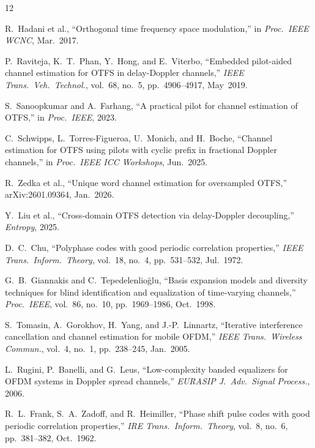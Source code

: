 \documentclass[11pt,a4paper,twoside]{article}
\begin{document}
\begin{thebibliography}{12}

R.~Hadani et al., ``Orthogonal time frequency space modulation,'' in \emph{Proc.\ IEEE WCNC}, Mar.~2017.

P.~Raviteja, K.~T.~Phan, Y.~Hong, and E.~Viterbo, ``Embedded pilot-aided channel estimation for OTFS in delay-Doppler channels,'' \emph{IEEE Trans.\ Veh.\ Technol.}, vol.~68, no.~5, pp.~4906--4917, May~2019.

S.~Sanoopkumar and A.~Farhang, ``A practical pilot for channel estimation of OTFS,'' in \emph{Proc.\ IEEE}, 2023.

C.~Schwipps, L.~Torres-Figueroa, U.~Monich, and H.~Boche, ``Channel estimation for OTFS using pilots with cyclic prefix in fractional Doppler channels,'' in \emph{Proc.\ IEEE ICC Workshops}, Jun.~2025.

R.~Zedka et al., ``Unique word channel estimation for oversampled OTFS,'' arXiv:2601.09364, Jan.~2026.

Y.~Liu et al., ``Cross-domain OTFS detection via delay-Doppler decoupling,'' \emph{Entropy}, 2025.

D.~C.~Chu, ``Polyphase codes with good periodic correlation properties,'' \emph{IEEE Trans.\ Inform.\ Theory}, vol.~18, no.~4, pp.~531--532, Jul.~1972.

G.~B.~Giannakis and C.~Tepedelenlio\u{g}lu, ``Basis expansion models and diversity techniques for blind identification and equalization of time-varying channels,'' \emph{Proc.\ IEEE}, vol.~86, no.~10, pp.~1969--1986, Oct.~1998.

S.~Tomasin, A.~Gorokhov, H.~Yang, and J.-P.~Linnartz, ``Iterative interference cancellation and channel estimation for mobile OFDM,'' \emph{IEEE Trans.\ Wireless Commun.}, vol.~4, no.~1, pp.~238--245, Jan.~2005.

L.~Rugini, P.~Banelli, and G.~Leus, ``Low-complexity banded equalizers for OFDM systems in Doppler spread channels,'' \emph{EURASIP J.\ Adv.\ Signal Process.}, 2006.

R.~L.~Frank, S.~A.~Zadoff, and R.~Heimiller, ``Phase shift pulse codes with good periodic correlation properties,'' \emph{IRE Trans.\ Inform.\ Theory}, vol.~8, no.~6, pp.~381--382, Oct.~1962.

\end{thebibliography}
\end{document}
